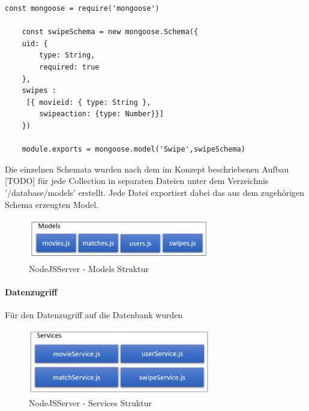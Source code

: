 \begin{lstlisting}[caption=Swipe Schema und Model, label=lst:modelswipe]
	const mongoose = require('mongoose')

	const swipeSchema = new mongoose.Schema({
    uid: {
        type: String,
        required: true
    },
    swipes :
     [{ movieid: { type: String },
        swipeaction: {type: Number}}]
	})

	module.exports = mongoose.model('Swipe',swipeSchema)
\end{lstlisting}

Die einzelnen Schemata wurden nach dem im Konzept beschriebenen Aufbau [TODO] für jede Collection in separaten Dateien unter dem Verzeichnis '/database/models' erstellt. Jede Datei exportiert dabei das aus dem zugehörigen Schema erzeugten Model.

\begin{figure}[h]
\centering
\includegraphics[width=8cm]{images/modelsstruktur.PNG}
\caption{NodeJSServer - Models Struktur}
\end{figure}

\paragraph{Datenzugriff}
Für den Datenzugriff auf die Datenbank wurden 


\begin{figure}[h]
\centering
\includegraphics[width=8cm]{images/serviceStruktur.PNG}
\caption{NodeJSServer - Services Struktur}
\end{figure}